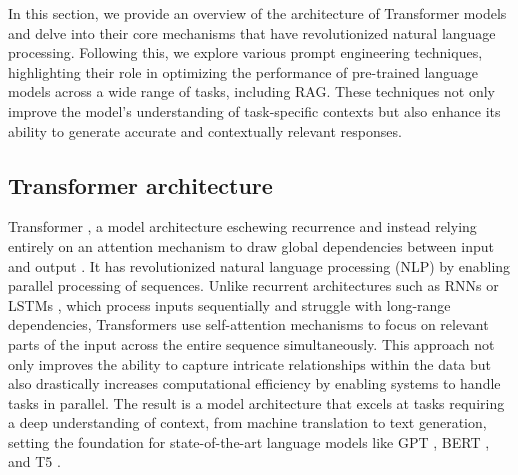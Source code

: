 In this section, we provide an overview of the architecture of Transformer models \cite{vaswani2017} and delve into their core mechanisms that have revolutionized natural language processing. Following this, we explore various prompt engineering techniques, highlighting their role in optimizing the performance of pre-trained language models across a wide range of tasks, including RAG. These techniques not only improve the model's understanding of task-specific contexts but also enhance its ability to generate accurate and contextually relevant responses.



\subsection{Transformer architecture}

Transformer \cite{vaswani2017}, a model architecture eschewing recurrence and instead relying entirely on an attention mechanism to draw global dependencies between input and output \cite{vaswani2017}. It has revolutionized natural language processing (NLP) by enabling parallel processing of sequences. Unlike recurrent architectures such as RNNs \cite{rumelhart1988rnn} or LSTMs \cite{lstm}, which process inputs sequentially and struggle with long-range dependencies, Transformers use self-attention mechanisms to focus on relevant parts of the input across the entire sequence simultaneously. This approach not only improves the ability to capture intricate relationships within the data but also drastically increases computational efficiency by enabling systems to handle tasks in parallel. The result is a model architecture that excels at tasks requiring a deep understanding of context, from machine translation to text generation, setting the foundation for state-of-the-art language models like GPT \cite{radford2018GPT}, BERT \cite{devlin2019bert}, and T5 \cite{raffel2023t5}.

